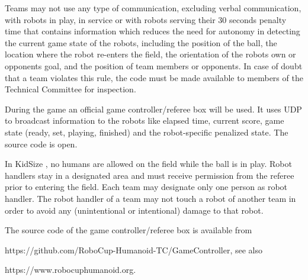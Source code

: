 \bigskip


Teams may not use any type of communication, excluding verbal communication,
with robots in play, in service or with robots serving their 30 seconds penalty
time that contains information which reduces the need for autonomy in detecting
the current game state of the robots, including the position of the ball,
the location where the robot re-enters the field,
the orientation of the robots own or opponents goal,
and the position of team members or opponents.
In case of doubt that a team violates this rule,
the code must be made available to members of the Technical Committee for inspection.

\bigskip

During the game an official game controller/referee box will be used.
It uses UDP to broadcast information to the robots like elapsed time,
current score, game state (ready, set, playing, finished) and the robot-specific
penalized state. The source code is open.



\bigskip

In KidSize , no humans are allowed on the field while the
ball is in play.
Robot handlers stay in a designated area and must receive permission from the
referee prior to entering the field.
Each team may designate only one person as robot handler.
The robot handler of a team may not touch a robot of another team in order to
avoid any (unintentional or intentional) damage to that robot. 

\bigskip

The source code of the game controller/referee box is available from

\textcolor[rgb]{0.0,0.0,0.49803922}{https://github.com/RoboCup-Humanoid-TC/GameController},
see also 

\textcolor[rgb]{0.0,0.0,0.49803922}{https://www.robocuphumanoid.org}.

